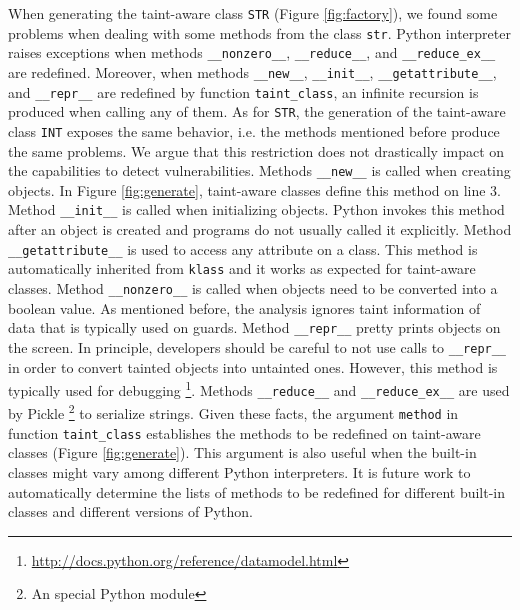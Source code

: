 \documentclass[oribibl]{llncs}
\newcommand{\nametklass}{taint-aware }
\begin{document}
When generating the taint-aware
class \texttt{STR} (Figure \ref{fig:factory}), 
we found some problems 
when dealing with   
some methods from the class \texttt{str}. 
Python interpreter raises exceptions when  
methods 
\texttt{\_\_nonzero\_\_},
\texttt{\_\_reduce\_\_}, and 
\texttt{\_\_reduce\_ex\_\_} are redefined.
Moreover, 
when methods  
\texttt{\_\_new\_\_}, \texttt{\_\_init\_\_}, 
\texttt{\_\_getattribute\_\_},  
and 
\texttt{\_\_repr\_\_}
are redefined by function \texttt{taint\_class},
an infinite recursion is produced when calling any of them.
As for \texttt{STR}, the generation of the \nametklass 
class \texttt{INT} exposes the same behavior, i.e. the 
methods mentioned before produce the same problems.
We argue 
that this restriction does not drastically impact on the capabilities to 
detect vulnerabilities.
Methods \texttt{\_\_new\_\_} 
is called 
when creating objects.
In Figure \ref{fig:generate}, \nametklass 
classes define this method 
on line 3.
Method \texttt{\_\_init\_\_} is called when 
initializing objects.  
Python invokes this method  after an object is created 
and programs do not usually called it explicitly.
Method \texttt{\_\_getattribute\_\_}
is used to access any attribute on a class.
This method is automatically inherited from 
\texttt{klass} and it works as expected for 
\nametklass classes.
Method \texttt{\_\_nonzero\_\_} is called when 
objects need to be converted into a boolean value.
As mentioned before, the
analysis ignores taint information of data 
that is typically used on guards. 
Method \texttt{\_\_repr\_\_} pretty prints  
objects on the screen. 
In principle, developers should be careful 
to not use calls to \texttt{\_\_repr\_\_} in order to 
convert tainted objects into untainted ones. 
However, this method is typically used for debugging 
\footnote{\url{http://docs.python.org/reference/datamodel.html}}.
Methods \texttt{\_\_reduce\_\_} and \texttt{\_\_reduce\_ex\_\_}
are used by Pickle \footnote{An special Python module} to serialize strings. 
Given these facts, 
the argument \texttt{method} in function \texttt{taint\_class} 
establishes the methods to be redefined on taint-aware classes
(Figure \ref{fig:generate}).
This argument is also useful when
the built-in classes might 
vary among different Python interpreters.
It is future work 
to automatically determine the lists of methods to be redefined for different 
built-in classes and different versions of Python.
\end{document}
